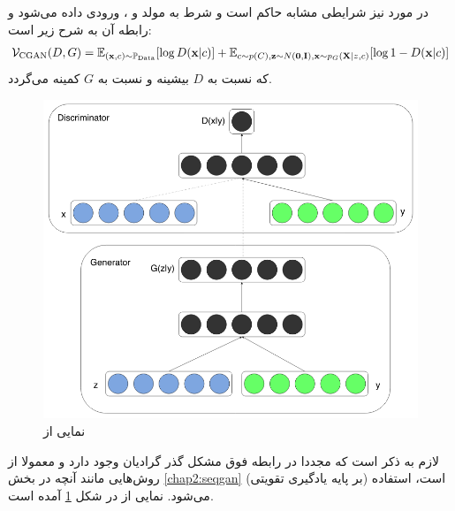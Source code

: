 \subsection{\cgan{}}
در مورد\gan{} نیز شرایطی مشابه \cvae{} حاکم است و شرط به مولد و \discriminator{}، ورودی داده می‌شود \cite{cgan} و رابطه آن به شرح زیر است:
\begin{align}
	{\mathcal{V}}_\text{CGAN}(D, G) =
	\mathbb E_{({\bf x}, c) \sim \mathbb P_\text{Data}} [\log D({\bf x}|c)] +
	\mathbb E_{c \sim p(C), {\bf z} \sim N({\bf 0}, {\bf I}),{\bf x} \sim p_G({\bf X}|z,c)} [\log 1 - D({\bf x}|c)]
\end{align}
که نسبت به $D$ بیشینه و نسبت به $G$ کمینه می‌گردد.
\begin{figure}[H]
	\centering
	\includegraphics[width=.7\textwidth]{images/cgan.png}
	\caption{نمایی از \cgan{}}
    \label{fig:chap2:cgan}
\end{figure}
لازم به ذکر است که مجددا در رابطه فوق مشکل گذر گرادیان وجود دارد و معمولا از روش‌هایی مانند آنچه در بخش \ref{chap2:seqgan} (بر پایه یادگیری تقویتی) است، استفاده می‌شود. نمایی از \cgan{} در شکل \ref{fig:chap2:cgan} آمده است.

